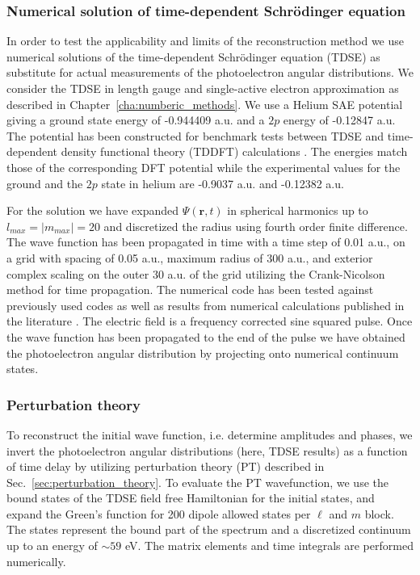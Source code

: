 \subsubsection{Numerical solution of time-dependent Schr\"odinger equation}

In order to test the applicability and limits of the reconstruction method we use numerical solutions of the time-dependent Schr\"odinger equation (TDSE) as substitute for actual measurements of the photoelectron angular distributions. We consider the TDSE in length gauge and single-active electron approximation as described in Chapter~\ref{cha:numberic_methods}. We use a Helium SAE potential
giving a ground state energy of -0.944409 a.u. and a $2p$ energy of -0.12847 a.u. The potential has been constructed for benchmark tests between TDSE and time-dependent density functional theory (TDDFT) calculations \cite{reiff2020}. The energies match those of the corresponding DFT potential while the experimental values for the ground and the $2p$ state in helium are -0.9037 a.u. and -0.12382 a.u.

For the solution we have expanded $\Psi(\mathbf{r},t)$ in spherical harmonics up to $l_{max} = |m_{max}| = 20$ and discretized the radius using fourth order finite difference. The wave function has been propagated in time with a time step of 0.01 a.u., on a grid with spacing of 0.05 a.u., maximum radius of 300 a.u., and exterior complex scaling on the outer 30 a.u. of the grid utilizing the Crank-Nicolson method for time propagation. The numerical code has been tested against previously used codes as well as results from numerical calculations published in the literature \cite{Scrinzi2010}. The electric field is a frequency corrected sine squared pulse.
Once the wave function has been propagated to the end of the pulse we have obtained the photoelectron angular distribution  by projecting onto numerical continuum states. 

\subsubsection{Perturbation theory}

To reconstruct the initial wave function, i.e. determine amplitudes and phases, we invert the photoelectron angular distributions (here, TDSE results) as a function of time delay by utilizing perturbation theory (PT) described in Sec.~\ref{sec:perturbation_theory}. To evaluate the PT wavefunction, we use the bound states of the TDSE field free Hamiltonian for the initial states, and expand the Green's function for 200 dipole allowed states per $\ell$ and $m$ block. The states represent the bound part of the spectrum and a discretized continuum up to an energy of $\sim59$ eV.
The matrix elements and time integrals are performed numerically.

